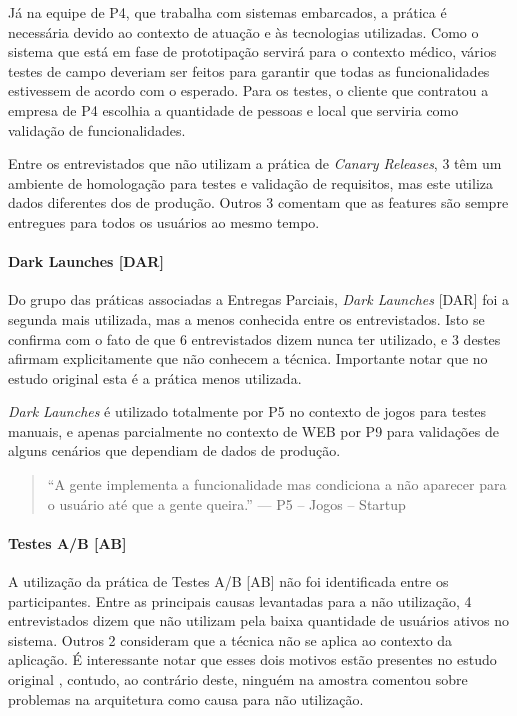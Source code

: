 Já na equipe de P4, que trabalha com sistemas embarcados, a prática é necessária devido ao contexto de atuação e às tecnologias utilizadas. Como o sistema que está em fase de prototipação servirá para o contexto médico, vários testes de campo deveriam ser feitos para garantir que todas as funcionalidades estivessem de acordo com o esperado. Para os testes, o cliente que contratou a empresa de P4 escolhia a quantidade de pessoas e local que serviria como validação de funcionalidades.

Entre os entrevistados que não utilizam a prática de \emph{Canary Releases}, 3 têm um ambiente de homologação para testes e validação de requisitos, mas este utiliza dados diferentes dos de produção. Outros 3 comentam que as features são sempre entregues para todos os usuários ao mesmo tempo.


\paragraph{Dark Launches [DAR]}

Do grupo das práticas associadas a Entregas Parciais, \emph{Dark Launches} [DAR] \cite{devAndDeploymentFB} foi a segunda mais utilizada, mas a menos conhecida entre os entrevistados. Isto se confirma com o fato de que 6 entrevistados dizem nunca ter utilizado, e 3 destes afirmam explicitamente que não conhecem a técnica. Importante notar que no estudo original \cite{empiricalStudy2016} esta é a prática menos utilizada.

\emph{Dark Launches} é utilizado totalmente por P5 no contexto de jogos para testes manuais, e apenas parcialmente no contexto de WEB por P9 para validações de alguns cenários que dependiam de dados de produção.


\begin{quote}
    ``A gente implementa a funcionalidade mas condiciona a não aparecer para o usuário até que a gente queira.'' --- P5 -- Jogos -- Startup
\end{quote}

\paragraph{Testes A/B [AB]}

A utilização da prática de Testes A/B [AB] \cite{testsAB} não foi identificada entre os participantes. Entre as principais causas levantadas para a não utilização, 4 entrevistados dizem que não utilizam pela baixa quantidade de usuários ativos no sistema. Outros 2 consideram que a técnica não se aplica ao contexto da aplicação. É interessante notar que esses dois motivos estão presentes no estudo original \cite{empiricalStudy2016}, contudo, ao contrário deste, ninguém na amostra comentou sobre problemas na arquitetura como causa para não utilização.



